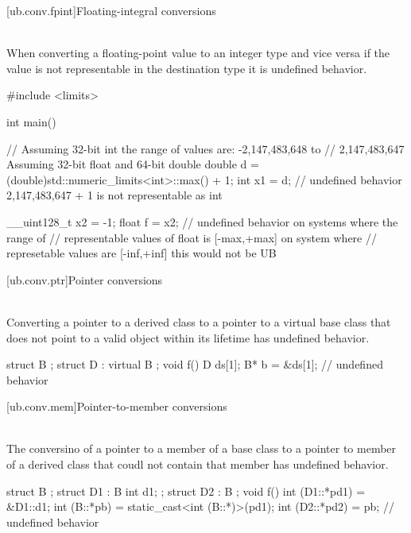 [ub.conv.fpint]{Floating-integral conversions}

\pnum
{} \\
When converting a floating-point value to an integer type and vice versa if
the value is not representable in the destination type it is undefined behavior.

\pnum
\begin{example}
\begin{codeblock}
#include <limits>

int main() {
  // Assuming 32-bit int the range of values are: -2,147,483,648 to
  // 2,147,483,647 Assuming 32-bit float and 64-bit double
  double d = (double)std::numeric_limits<int>::max() + 1;
  int x1 = d;   // undefined behavior 2,147,483,647 + 1 is not representable as int

  __uint128_t x2 = -1;
  float f = x2; // undefined behavior on systems where the range of
                // representable values of float is [-max,+max] on system where
                // represetable values are [-inf,+inf] this would not be UB
}
\end{codeblock}
\end{example}

[ub.conv.ptr]{Pointer conversions}

\pnum
{} \\
Converting
a pointer to a derived class  
to
a pointer to a virtual base class 
that does not point to
a valid object
within its lifetime
has undefined behavior.

\pnum
\begin{example}
\begin{codeblock}
struct B {};
struct D : virtual B {};
void f()
{
  D ds[1];
  B* b = &ds[1];  // undefined behavior
}
\end{codeblock}
\end{example}

[ub.conv.mem]{Pointer-to-member conversions}

\pnum
{} \\
The conversino of
a pointer to a member of a base class
to a pointer to member of a derived class
that coudl not contain that member
has undefined behavior.

\pnum
\begin{example}
\begin{codeblock}
struct B {};
struct D1 : B { int d1; };
struct D2 : B {};
void f()
{
  int (D1::*pd1) = &D1::d1;
  int (B::*pb) = static_cast<int (B::*)>(pd1);
  int (D2::*pd2) = pb;  // undefined behavior
}
\end{codeblock}
\end{example}



